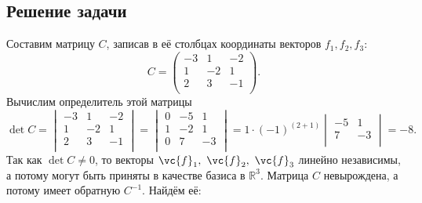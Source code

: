 \subsection*{Решение задачи}


Составим матрицу $C$, записав в её столбцах координаты векторов $f_1, f_2, f_3$:
\begin{equation*}
    C = \begin{pmatrix}
        -3 & 1 & -2 \\
        1 & -2 & 1 \\
        2 & 3 & -1 \\
    \end{pmatrix}.
\end{equation*}
Вычислим определитель этой матрицы
\begin{equation*}
    \det C = \begin{vmatrix}
        -3 & 1 & -2 \\
        1 & -2 & 1 \\
        2 & 3 & -1 \\
    \end{vmatrix} = 
    \begin{vmatrix}
        0 & -5 & 1 \\
        1 & -2 & 1 \\
        0 & 7 & -3 \\
    \end{vmatrix} = 
    1 \cdot (-1)^{(2+1)} \begin{vmatrix}
        -5 & 1\\
        7 & -3 \\
    \end{vmatrix} = -8.
\end{equation*}
Так как $\det C \neq 0$, то векторы $\vc{f}_1, \ \vc{f}_2, \ \vc{f}_3$ линейно независимы, а потому могут быть приняты в качестве базиса в $\mathbb{R}^3$. Матрица $C$ невырождена, а потому имеет обратную $C^{-1}$. Найдём её:

